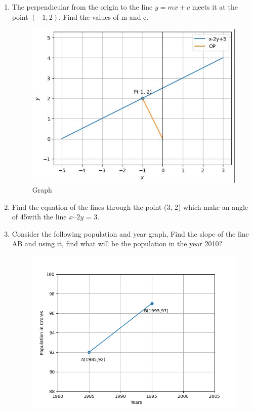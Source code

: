 \begin{enumerate}[label=\thesection.\arabic*,ref=\thesection.\theenumi]
 \item The perpendicular from the origin to the line $y=mx+c$ meets it at the point $(-1,2)$. Find the values of m and c.
 \solution
 \label{11.10.3.15}
 \begin{figure}[!ht]
 \centering
 \includegraphics[width=\columnwidth]{chapters/11/10/3/15/figs/graph.jpg}
 \caption{Graph}
 \label{fig:pic}
 \end{figure}
\item Find the equation of the lines through the point (3, 2) which make an angle of 45\degree  with the line $x – 2y$ = 3.
\label{chapters/11/10/4/11}\\
\solution
%
\item Consider the following population and year graph, Find the slope of the line AB and using it, find what will be the population in the year 2010?
\\
\begin{figure}[!ht]
\centering
\includegraphics[width = \columnwidth]{chapters/11/10/1/14/figs/fig.png}
\caption{}
\label{fig:chapters/11/10/1/14/1}
\end{figure}
\solution

 
\end{enumerate}
